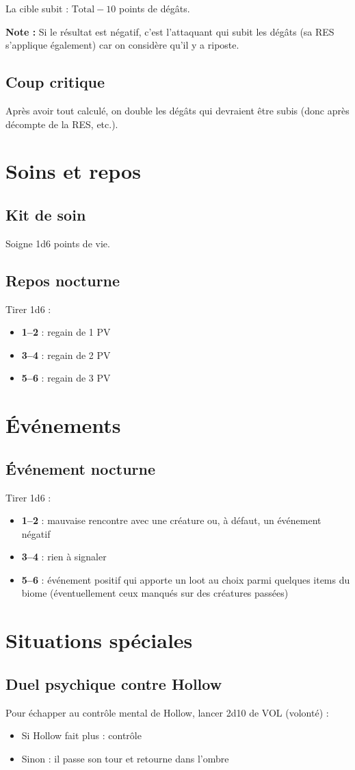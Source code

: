 \documentclass[12pt,a4paper]{article}
\begin{document}
La cible subit : $\text{Total} - 10$ points de dégâts.

\textbf{Note :} Si le résultat est négatif, c'est l'attaquant qui subit les dégâts (sa RES s'applique également) car on considère qu'il y a riposte.

\subsection{Coup critique}
Après avoir tout calculé, on double les dégâts qui devraient être subis (donc après décompte de la RES, etc.).

\section{Soins et repos}

\subsection{Kit de soin}
Soigne 1d6 points de vie.

\subsection{Repos nocturne}
Tirer 1d6 :
\begin{itemize}[label=--]
    \item \textbf{1--2} : regain de 1 PV
    \item \textbf{3--4} : regain de 2 PV
    \item \textbf{5--6} : regain de 3 PV
\end{itemize}

\section{Événements}

\subsection{Événement nocturne}
Tirer 1d6 :
\begin{itemize}[label=--]
    \item \textbf{1--2} : mauvaise rencontre avec une créature ou, à défaut, un événement négatif
    \item \textbf{3--4} : rien à signaler
    \item \textbf{5--6} : événement positif qui apporte un loot au choix parmi quelques items du biome (éventuellement ceux manqués sur des créatures passées)
\end{itemize}

\section{Situations spéciales}

\subsection{Duel psychique contre Hollow}
Pour échapper au contrôle mental de Hollow, lancer 2d10 de VOL (volonté) :
\begin{itemize}[label=--]
    \item Si Hollow fait plus : contrôle
    \item Sinon : il passe son tour et retourne dans l'ombre
\end{itemize}
\end{document}
